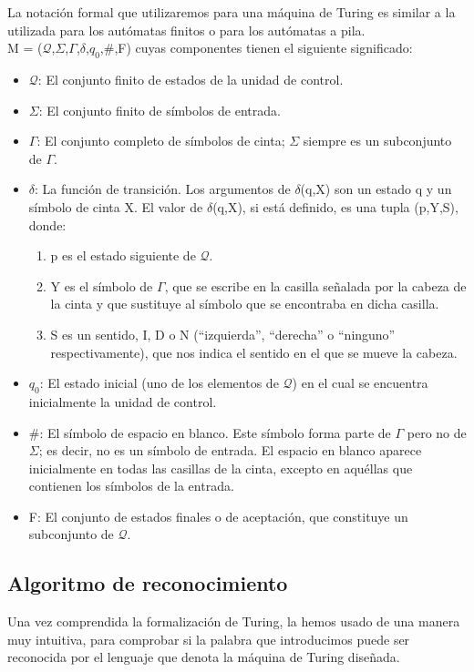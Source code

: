\documentclass[12pt,a4paper,spanish]{book}
\begin{document}
La notaci\'on formal que utilizaremos para una m\'aquina de Turing es similar a la
utilizada para los aut\'omatas finitos o para los aut\'omatas a pila.\\
M = ($\mathcal{Q}$,$\Sigma$,$\Gamma$,$\delta$,$q_{0}$,\#,F)
cuyas componentes tienen el siguiente significado:
\begin{itemize}
\item $\mathcal{Q}$: El conjunto finito de estados de la unidad de control.
\item $\Sigma$: El conjunto finito de s\'imbolos de entrada.
\item $\Gamma$: El conjunto completo de s\'imbolos de cinta; $\Sigma$ siempre es un
subconjunto de $\Gamma$.
\item $\delta$: La funci\'on de transici\'on. Los argumentos de $\delta$(q,X) son un
estado q y un s\'imbolo de cinta X. El valor de $\delta$(q,X), si est\'a definido, es una
tupla (p,Y,S), donde:
\begin{enumerate}
\item p es el estado siguiente de $\mathcal{Q}$.
\item Y es el s\'imbolo de $\Gamma$, que se escribe en la casilla se\~nalada por la
cabeza de la cinta y que sustituye al s\'imbolo que se encontraba en dicha casilla.
\item S es un sentido, I, D o N (``izquierda'', ``derecha'' o ``ninguno'' respectivamente),
que nos indica el sentido en el que se mueve la cabeza.
\end{enumerate}
\item $q_{0}$: El estado inicial (uno de los elementos de $\mathcal{Q}$) en el cual se encuentra
inicialmente la unidad de control.
\item \#: El s\'imbolo de espacio en blanco. Este s\'imbolo forma parte de $\Gamma$
pero no de $\Sigma$; es decir, no es un s\'imbolo de entrada. El espacio en blanco
aparece inicialmente en todas las casillas de la cinta, excepto en aqu\'ellas que
contienen los s\'imbolos de la entrada.
\item F: El conjunto de estados finales o de aceptaci\'on, que constituye un
subconjunto de $\mathcal{Q}$.
\end{itemize}


\subsection{Algoritmo de reconocimiento}
Una vez comprendida la formalizaci\'on de Turing, la hemos usado de una manera muy intuitiva, para comprobar si la palabra que introducimos puede ser reconocida por el lenguaje que denota la m\'aquina de Turing dise\~nada.
\end{document}

